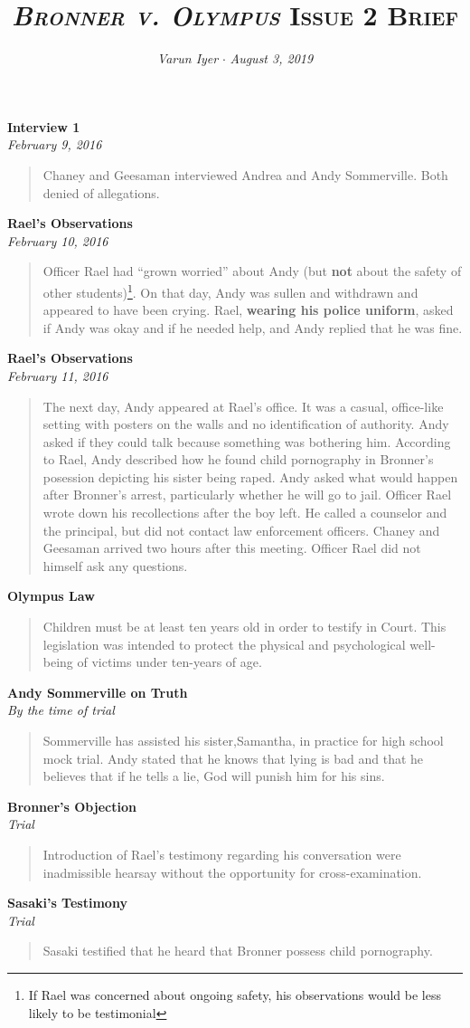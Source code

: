 \documentclass[paper=letter,fontsize=10pt]{article}
\title{\textsc{\textit{Bronner v. Olympus} Issue 2 Brief}}
\date{}
\author{\textit{Varun Iyer} \hspace{.5em} $\cdot$ \hspace{.5em} \textit{August 3, 2019}}
\newcommand{\inv}[3]{\noindent \textbf{#1} \\ \noindent \textit{#2} \begin{quote} #3 \end{quote} \par}
\begin{document}
\maketitle
\inv{Interview 1}{February 9, 2016} {
	Chaney and Geesaman interviewed Andrea and Andy Sommerville. Both denied of allegations.
}
\inv{Rael’s Observations}{February 10, 2016} {
	Officer Rael had “grown worried” about Andy (but \textbf{not} about the safety of other students)\footnote{If Rael was concerned about ongoing safety, his observations would be less likely to be testimonial}.
	On that day, Andy was sullen and withdrawn and appeared to have been crying.
	Rael, \textbf{wearing his police uniform}, asked if Andy was okay and if he needed help, and Andy replied that he was fine.
}
\inv{Rael’s Observations}{February 11, 2016} {
	The next day, Andy appeared at Rael’s office. It was a casual, office-like setting with posters on the walls and no identification of authority. Andy asked if they could talk because something was bothering him. According to Rael, Andy described how he found child pornography in Bronner’s posession depicting his sister being raped.
	Andy asked what would happen after Bronner’s arrest, particularly whether he will go to jail.
	Officer Rael wrote down his recollections after the boy left. He called a counselor and the principal, but did not contact law enforcement officers.
	Chaney and Geesaman arrived two hours after this meeting.
	Officer Rael did not himself ask any questions.
}
\inv{Olympus Law}{}{
	Children must be at least ten years old in order to testify in Court. This legislation was intended to protect the physical and psychological well-being of victims under ten-years of age.
}

\inv{Andy Sommerville on Truth}{By the time of trial}{
	Sommerville has assisted his sister,Samantha, in practice for high school mock trial. Andy stated that he knows that lying is bad and that he believes that if he tells a lie, God will punish him for his sins.
}

\inv{Bronner’s Objection}{Trial}{
	Introduction of Rael’s testimony regarding his conversation were inadmissible hearsay without the opportunity for cross-examination.
}

\inv{Sasaki’s Testimony}{Trial}{
	Sasaki testified that he heard that Bronner possess child pornography.
}
\end{document}
